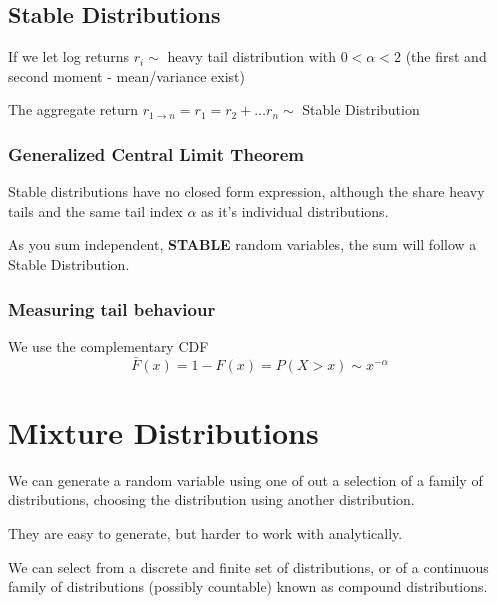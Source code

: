\documentclass[
  oneside]{book}
\begin{document}
\hypertarget{stable-distributions}{%
\subsection{Stable Distributions}\label{stable-distributions}}

If we let log returns \(r_{i} \sim\) heavy tail distribution with \(0<\alpha<2\) (the first and second moment - mean/variance exist)

The aggregate return \(r_{1\to n} = r_{1} = r_{2} + \dots r_{n} \sim\) Stable Distribution

\hypertarget{generalized-central-limit-theorem}{%
\subsubsection{Generalized Central Limit Theorem}\label{generalized-central-limit-theorem}}

Stable distributions have no closed form expression, although the share heavy tails and the same tail index \(\alpha\) as it's individual distributions.

As you sum independent, \textbf{STABLE} random variables, the sum will follow a Stable Distribution.

\hypertarget{measuring-tail-behaviour}{%
\subsubsection{Measuring tail behaviour}\label{measuring-tail-behaviour}}

We use the complementary CDF
\[
\bar{F}(x) = 1 - F(x) = P(X > x) \sim x^{-\alpha}
\]

\hypertarget{mixture-distributions}{%
\section{Mixture Distributions}\label{mixture-distributions}}

We can generate a random variable using one of out a selection of a family of distributions, choosing the distribution using another distribution.

They are easy to generate, but harder to work with analytically.

We can select from a discrete and finite set of distributions, or of a continuous family of distributions (possibly countable) known as compound distributions.
\end{document}
